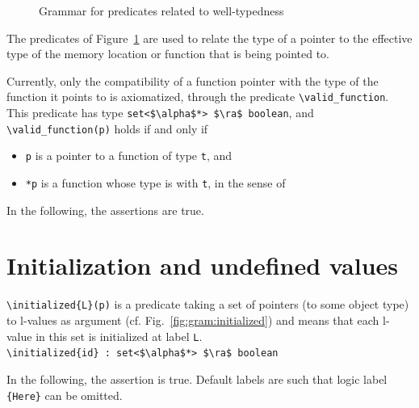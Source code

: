 \begin{figure}[htp]
  \begin{cadre}
      
    \end{cadre}
  \caption{Grammar for predicates related to well-typedness }
\label{fig:gram:welltyped}
\end{figure}

The predicates of Figure~\ref{fig:gram:welltyped} are used to relate
the type of a pointer to the effective type of the memory location or function
that is being pointed to.

Currently, only the compatibility of a function pointer with the type of
the function it points to is axiomatized, through the predicate
\lstinline|\valid_function|. This predicate has type
\lstinline|set<$\alpha$*> $\ra$ boolean|,
and \lstinline|\valid_function(p)| holds if and only if
\begin{itemize}
\item \lstinline|p| is a pointer to a function of type \lstinline|t|, and
\item \lstinline|*p| is a function whose type is
\iftoggle{isCPP}{\emph{layout-compatible}}{\emph{compatible}}
  with \lstinline|t|, in the sense of
\iftoggle{isCPP}
{\cite{C++-2011} \S3.9 [basic.types], alinea 11}
{\cite[\S6.2.7]{standardc99}}
\end{itemize}

\begin{example}
  In the following, the assertions are true.
\end{example}


\section{Initialization and undefined values}
\label{sec:initialized}
\lstinline|\initialized{L}(p)| is a predicate taking a set of pointers
(to some object type) to l-values as
argument (cf. Fig.~\ref{fig:gram:initialized}) and means that each l-value in this set is initialized at label \lstinline|L|.
\\ \makebox[5mm]{} \lstinline|\initialized{id} : set<$\alpha$*> $\ra$ boolean|

\begin{example}
  In the following, the assertion is true.
  Default labels are
  such that logic label \lstinline|{Here}| can be omitted.
\end{example}

